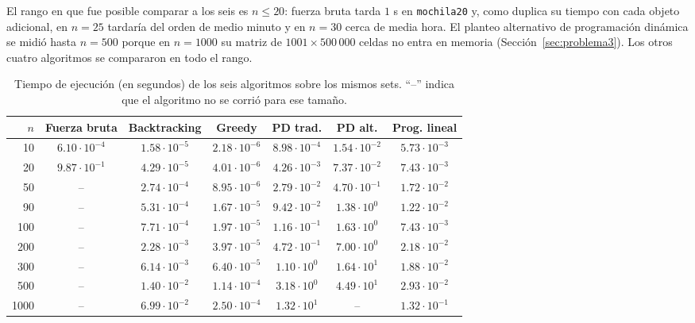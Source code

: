 \documentclass[11pt,a4paper]{article}
\begin{document}
El rango en que fue posible comparar a los seis es $n \le 20$: fuerza bruta tarda $1$ s en \texttt{mochila20} y, como duplica su tiempo con cada objeto adicional, en $n = 25$ tardaría del orden de medio minuto y en $n = 30$ cerca de media hora. El planteo alternativo de programación dinámica se midió hasta $n = 500$ porque en $n = 1000$ su matriz de $1001 \times 500\,000$ celdas no entra en memoria (Sección~\ref{sec:problema3}). Los otros cuatro algoritmos se compararon en todo el rango.

\begin{table}[h!]
    \centering
    \small
    \begin{tabular}{@{}rcccccc@{}}
        \toprule
        $n$ & \textbf{Fuerza bruta} & \textbf{Backtracking} & \textbf{Greedy} & \textbf{PD trad.} & \textbf{PD alt.} & \textbf{Prog. lineal} \\ \midrule
        10   & $6.10 \cdot 10^{-4}$ & $1.58 \cdot 10^{-5}$ & $2.18 \cdot 10^{-6}$ & $8.98 \cdot 10^{-4}$ & $1.54 \cdot 10^{-2}$ & $5.73 \cdot 10^{-3}$ \\
        20   & $9.87 \cdot 10^{-1}$ & $4.29 \cdot 10^{-5}$ & $4.01 \cdot 10^{-6}$ & $4.26 \cdot 10^{-3}$ & $7.37 \cdot 10^{-2}$ & $7.43 \cdot 10^{-3}$ \\
        50   & -- & $2.74 \cdot 10^{-4}$ & $8.95 \cdot 10^{-6}$ & $2.79 \cdot 10^{-2}$ & $4.70 \cdot 10^{-1}$ & $1.72 \cdot 10^{-2}$ \\
        90   & -- & $5.31 \cdot 10^{-4}$ & $1.67 \cdot 10^{-5}$ & $9.42 \cdot 10^{-2}$ & $1.38 \cdot 10^{0}$  & $1.22 \cdot 10^{-2}$ \\
        100  & -- & $7.71 \cdot 10^{-4}$ & $1.97 \cdot 10^{-5}$ & $1.16 \cdot 10^{-1}$ & $1.63 \cdot 10^{0}$  & $7.43 \cdot 10^{-3}$ \\
        200  & -- & $2.28 \cdot 10^{-3}$ & $3.97 \cdot 10^{-5}$ & $4.72 \cdot 10^{-1}$ & $7.00 \cdot 10^{0}$  & $2.18 \cdot 10^{-2}$ \\
        300  & -- & $6.14 \cdot 10^{-3}$ & $6.40 \cdot 10^{-5}$ & $1.10 \cdot 10^{0}$  & $1.64 \cdot 10^{1}$  & $1.88 \cdot 10^{-2}$ \\
        500  & -- & $1.40 \cdot 10^{-2}$ & $1.14 \cdot 10^{-4}$ & $3.18 \cdot 10^{0}$  & $4.49 \cdot 10^{1}$  & $2.93 \cdot 10^{-2}$ \\
        1000 & -- & $6.99 \cdot 10^{-2}$ & $2.50 \cdot 10^{-4}$ & $1.32 \cdot 10^{1}$  & -- & $1.32 \cdot 10^{-1}$ \\
        \bottomrule
    \end{tabular}
    \caption{Tiempo de ejecución (en segundos) de los seis algoritmos sobre los mismos sets. ``--'' indica que el algoritmo no se corrió para ese tamaño.}
    \label{tab:conclusion_tiempos}
\end{table}
\end{document}

